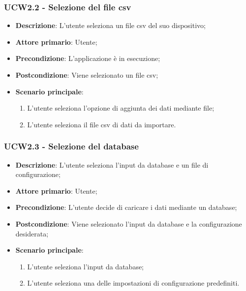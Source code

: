 \subsubsection{UCW2.2 - Selezione del file csv}
\label{ssub:ucw2.2}
\begin{itemize}
    \item \textbf{Descrizione}: L'utente seleziona un file csv del suo dispositivo;

    \item \textbf{Attore primario}: Utente;
    
    \item \textbf{Precondizione}:   L'applicazione è in esecuzione;
    \item \textbf{Postcondizione}:  Viene selezionato un file csv;

	\item \textbf{Scenario principale}:
		\begin{enumerate}
			\item L'utente seleziona l'opzione di aggiunta dei dati mediante file;
			\item L'utente seleziona il file csv di dati da importare.
        \end{enumerate}
\end{itemize}

\subsubsection{UCW2.3 - Selezione del database}
\label{ssub:ucw2.3}
\begin{itemize}
    \item \textbf{Descrizione}: L'utente seleziona l'input da database e un file di configurazione;
	
    \item \textbf{Attore primario}: Utente;
    
    \item \textbf{Precondizione}:   L'utente decide di caricare i dati mediante un database;
    \item \textbf{Postcondizione}:  Viene selezionato l'input da database e la configurazione desiderata;

	\item \textbf{Scenario principale}:
		\begin{enumerate}
			\item L'utente seleziona l'input da database;
			\item L'utente seleziona una delle impostazioni di configurazione predefiniti.
        \end{enumerate}

\end{itemize}
